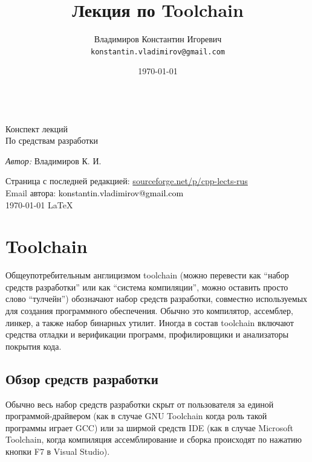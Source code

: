 \documentclass[a4paper,12pt,oneside]{article}
\title{Лекция по Toolchain}
\author{
  Владимиров Константин Игоревич\\
  \texttt{konstantin.vladimirov@gmail.com}
}
\date{\today}
\renewcommand{\texttt}[2][black]{\textcolor{#1}{\ttfamily #2}}
\begin{document}
\begin{titlepage}
\begin{center}

\large ~ \\[4.5cm]

\huge Конспект лекций\\[0.6cm]
\large По средствам разработки\\[3.7cm]

\begin{minipage}{0.5\textwidth} %
\begin{flushleft} %
\emph{Автор:} Владимиров К. И.\\
\end{flushleft} %
\end{minipage} %

\vfill

Страница с последней редакцией: \url{sourceforge.net/p/cpp-lects-rus}\\
Email автора: \texttt{konstantin.vladimirov@gmail.com}\\
{\large \today}
{\large \LaTeX}

\end{center}
\thispagestyle{empty}
\end{titlepage}

\tableofcontents

\pagebreak
\section{Toolchain}\label{sec:Toolchain}

Общеупотребительным англицизмом toolchain (можно перевести как ``набор средств разработки'' или как ``система компиляции'', можно оставить просто слово ``тулчейн'') обозначают набор средств разработки, совместно используемых для создания программного обеспечения. Обычно это компилятор, ассемблер, линкер, а также набор бинарных утилит. Иногда в состав toolchain включают средства отладки и верификации программ, профилировщики и анализаторы покрытия кода.

\subsection{Обзор средств разработки}\label{subsec:Overview}

Обычно весь набор средств разработки скрыт от пользователя за единой программой-драйвером (как в случае GNU Toolchain когда роль такой программы играет GCC) или за ширмой средств IDE (как в случае Microsoft Toolchain, когда компиляция ассемблирование и сборка происходят по нажатию кнопки F7 в Visual Studio).
\end{document}
